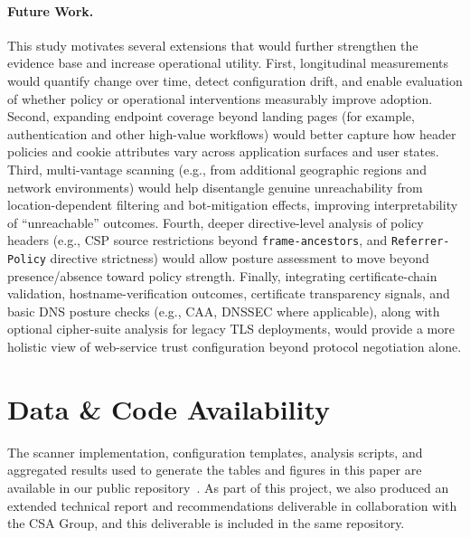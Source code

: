 \documentclass[a4paper,fleqn]{cas-sc}
\begin{document}
\paragraph{Future Work.}
This study motivates several extensions that would further strengthen the evidence base and increase operational utility. 
First, longitudinal measurements would quantify change over time, detect configuration drift, and enable evaluation of whether policy or operational interventions measurably improve adoption. 
Second, expanding endpoint coverage beyond landing pages (for example, authentication and other high-value workflows) would better capture how header policies and cookie attributes vary across application surfaces and user states. 
Third, multi-vantage scanning (e.g., from additional geographic regions and network environments) would help disentangle genuine unreachability from location-dependent filtering and bot-mitigation effects, improving interpretability of ``unreachable'' outcomes. 
Fourth, deeper directive-level analysis of policy headers (e.g., CSP source restrictions beyond \texttt{frame-ancestors}, and \texttt{Referrer-Policy} directive strictness) would allow posture assessment to move beyond presence/absence toward policy strength. 
Finally, integrating certificate-chain validation, hostname-verification outcomes, certificate transparency signals, and basic DNS posture checks (e.g., CAA, DNSSEC where applicable), along with optional cipher-suite analysis for legacy TLS deployments, would provide a more holistic view of web-service trust configuration beyond protocol negotiation alone.

\section*{Data \& Code Availability}
The scanner implementation, configuration templates, analysis scripts, and aggregated results used to generate the tables and figures in this paper are available in our public repository~\cite{latta_scanner_2026}. 
As part of this project, we also produced an extended technical report and recommendations deliverable in collaboration with the CSA Group, and this deliverable is included in the same repository.
\end{document}
